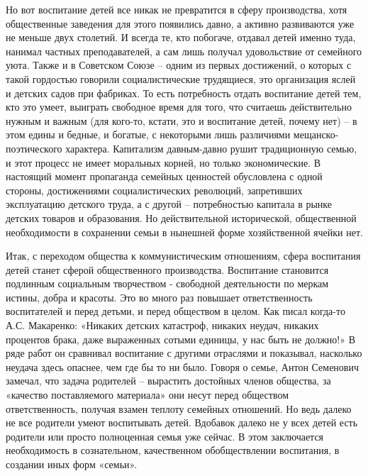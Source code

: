 \documentclass[12pt,a4paper,openany]{book}
\begin{document}
Но вот воспитание детей все никак не превратится в сферу производства, хотя общественные заведения для этого появились давно, а активно развиваются уже не меньше двух столетий. И всегда те, кто побогаче, отдавал детей именно туда, нанимал частных преподавателей, а сам лишь получал удовольствие от семейного уюта. Также и в Советском Союзе – одним из первых достижений, о которых с такой гордостью говорили социалистические трудящиеся, это организация яслей и детских садов при фабриках. То есть потребность отдать воспитание детей тем, кто это умеет, выиграть свободное время для того, что считаешь действительно нужным и важным (для кого-то, кстати, это и воспитание детей, почему нет) – в этом едины и бедные, и богатые, с некоторыми лишь различиями мещанско-поэтического характера. Капитализм давным-давно рушит традиционную семью, и этот процесс не имеет моральных корней, но только экономические. В настоящий момент пропаганда семейных ценностей обусловлена с одной стороны, достижениями социалистических революций, запретивших эксплуатацию детского труда, а с другой – потребностью капитала в рынке детских товаров и образования. Но действительной исторической, общественной необходимости в сохранении семьи в нынешней форме хозяйственной ячейки нет.

Итак, с переходом общества к коммунистическим отношениям, сфера воспитания детей станет сферой общественного производства. Воспитание становится подлинным социальным творчеством - свободной деятельности по меркам истины, добра и красоты. Это во много раз повышает ответственность воспитателей и перед детьми, и перед обществом в целом. Как писал когда-то А.С. Макаренко: «Никаких детских катастроф, никаких неудач, никаких процентов брака, даже выраженных сотыми единицы, у нас быть не должно!» В ряде работ он сравнивал воспитание с другими отраслями и показывал, насколько неудача здесь опаснее, чем где бы то ни было. Говоря о семье, Антон Семенович замечал, что задача родителей – вырастить достойных членов общества, за «качество поставляемого материала» они несут перед обществом ответственность, получая взамен теплоту семейных отношений. Но ведь далеко не все родители умеют воспитывать детей. Вдобавок далеко не у всех детей есть родители или просто полноценная семья уже сейчас. В этом заключается необходимость в сознательном, качественном обобществлении воспитания, в создании иных форм «семьи».
\end{document}
